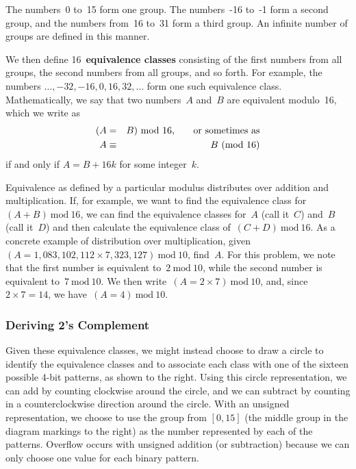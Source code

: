 The numbers~0 to~15 form one group.  The numbers~-16 to~-1 form a
second group, and the numbers from~16 to~31 form a third group. 
An infinite number of groups are defined in this manner.

We then define 16~{\bf equivalence classes} consisting of the first numbers
from all groups, the second numbers from all groups, and so forth.
For example, the numbers $\ldots, -32, -16, 0, 16, 32, \ldots$ form
one such equivalence class.
%
Mathematically, we say that two numbers~$A$ and~$B$ are equivalent modulo~16,
which we write as
%
\begin{eqnarray*}
(A &=& B)~\mbox{mod}~16, \protect{\hspace{0.25in}}\mbox{or sometimes as}\\
A &\equiv& B~\mbox{(mod 16)}
\end{eqnarray*}
%
if and only if $A=B+16k$ for some integer~$k$.

Equivalence as defined by a particular modulus
distributes over addition and multiplication.  If, for example,
we want to find the equivalence class for~$(A + B)~\mbox{mod}~16$,
we can find the equivalence classes for~$A$ (call it~$C$) and~$B$ 
(call it~$D$) and then calculate the equivalence class 
of~$(C + D)~\mbox{mod}~16$.
As a concrete example of distribution over multiplication, 
given~$(A = 1,083,102,112 \times 7,323,127)~\mbox{mod}~10$,
find~$A$.
%
For this problem, we note that the first number is equivalent 
to~$2~\mbox{mod}~10$, while the second number is equivalent 
to~$7~\mbox{mod}~10$.  We then write~$(A = 2 \times 7)~\mbox{mod}~10$,
and, since $2 \times 7 = 14$, we have~$(A = 4)~\mbox{mod}~10$.
\\

\subsubsection{Deriving 2's Complement}

\begin{minipage}{2.6in}
Given these equivalence classes, we might instead choose to draw a circle
to identify the equivalence classes and to associate each class with one
of the sixteen possible \mbox{4-bit} patterns, as shown to the right.
Using this circle representation, we can add by counting clockwise around
the circle, and we can subtract by counting in a counterclockwise direction
around the circle.  With an unsigned representation, we choose to use the
group from $[0,15]$ (the middle group in the diagram markings to the right)
as the number represented by each of the patterns.  Overflow occurs
with unsigned addition (or subtraction) because we can only choose one
value for each binary pattern.
\end{minipage}\hspace{.25in}%
\begin{minipage}{3.65in}
\end{minipage}

